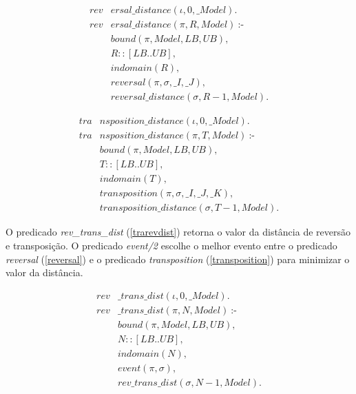 \begin{align}
  \label{revdistance}
  \textit{rev}&\textit{ersal\_distance}(\iota, 0, \_Model). \nonumber\\
  \textit{rev}&\textit{ersal\_distance}(\pi, R, Model)~\text{:-} \nonumber\\
  &\textit{bound}(\pi, Model, LB, UB), \nonumber\\
  &R :: [LB .. UB], \\
  &\textit{indomain}(R), \nonumber \\
  &\textit{reversal}(\pi, \sigma, \_I, \_J), \nonumber \\
  &\textit{reversal\_distance}(\sigma, R-1, Model). \nonumber
\end{align}

\begin{align}
  \label{tradistance}
  \textit{tra}&\textit{nsposition\_distance}(\iota, 0, \_Model). \nonumber\\
  \textit{tra}&\textit{nsposition\_distance}(\pi, T, Model)~\text{:-} \nonumber\\
  &\textit{bound}(\pi, Model, LB, UB), \nonumber\\
  &T :: [LB .. UB], \\
  &\textit{indomain}(T), \nonumber \\
  &\textit{transposition}(\pi, \sigma, \_I, \_J, \_K), \nonumber \\
  &\textit{transposition\_distance}(\sigma, T-1, Model). \nonumber
\end{align}

O predicado \textit{rev\_trans\_dist} (\ref{trarevdist}) retorna o
valor da distância de reversão e transposição. O
predicado \textit{event/2} escolhe o melhor evento entre o
predicado \textit{reversal} (\ref{reversal}) e o predicado
\textit{transposition} (\ref{transposition}) para minimizar o valor da distância.

\begin{align}
  \label{trarevdist}
  \textit{rev}&\textit{\_trans\_dist}(\iota, 0, \_Model). \nonumber\\
  \textit{rev}&\textit{\_trans\_dist}(\pi, N, Model)~\text{:-} \nonumber\\
  &\textit{bound}(\pi, Model, LB, UB), \nonumber\\
  &N :: [LB .. UB], \\
  &\textit{indomain}(N), \nonumber \\
  &\textit{event}(\pi, \sigma), \nonumber \\
  &\textit{rev\_trans\_dist}(\sigma, N-1, Model). \nonumber
\end{align}

